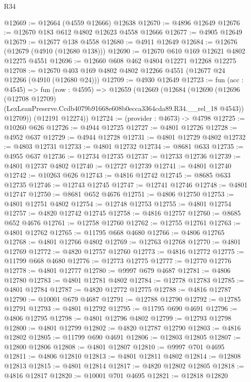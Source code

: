 \begin{lexlean}{R34}
\begin{coremodule}
@12669 := @12664 (@4559 @12666) @12638
@12670 := @4896 @12649
@12676 := @12670 @183 @612 @4802 @12623 @4558 @12666
@12677 := @4905 @12649
@12679 := @12677 @138 @4558
@12680 := @4911 @12649
@12684 := @12676 (@12679 (@4910 (@12680 @138)))
@12690 := @12670 @610 @169 @12621 @4802 @12275 @4551
@12696 := @12660 @608 @462 @4804 @12271 @12268 @12275
@12708 := @12670 @403 @169 @4802 @4802 @12266 @4551 (@12677 @24 @12266 (@4910 (@12680 @24)))
@12709 := @4930 @12649
@12723 := fun (acc : @4545) =>
  fun (row : @4595) =>
  @12659
    (@12669
      (@12684
        (@12690
          (@12696
            (@12708 @12709)
            (LexLeanPreserve.Ccdb4079b91668e608b0ecca3364cda89.R34.__rel_18 @4543))
          @12709))
      (@12191 @12274))
@12724 := (provider : @4673) -> @4798
@12725 := @10260 @626
@12726 := @4944 @12725
@12727 := @4801 @12726
@12728 := @4952 @637
@12729 := @4944 @12728
@12731 := @4801 @12729 @4802
@12732 := @4803 @12731
@12733 := @4801 @12732
@12734 := @8681 @633
@12735 := @4955 @637
@12736 := @12734 @12735
@12737 := @12733 @12736
@12739 := @4801 @12737 @4802
@12740 := @12727 @12739
@12741 := @4801 @12740
@12742 := @10263 @626
@12743 := @4816 @12742
@12745 := @8685 @633 @12735
@12746 := @12743 @12745
@12747 := @12741 @12746
@12748 := @4801 @12747
@12750 := @8681 @652 @4676
@12751 := @4806 @12750
@12753 := @4801 @12751 @4802
@12754 := @12748 @12753
@12755 := @4801 @12754
@12757 := @4820 @12742 @12745
@12758 := @4816 @12757
@12760 := @8685 @652 @4676
@12761 := @12758 @12760
@12762 := @12755 @12761
@12763 := @4801 @12762
@12765 := @11795 @668 @4680
@12766 := @4806 @12765
@12768 := @4801 @12766 @4802
@12769 := @12763 @12768
@12770 := @4801 @12769
@12772 := @4820 @12757 @12760
@12773 := @4816 @12772
@12775 := @11799 @668 @4680
@12776 := @12773 @12775
@12777 := @12770 @12776
@12778 := @4801 @12777
@12780 := @9997 @679 @4687
@12781 := @4806 @12780
@12783 := @4801 @12781 @4802
@12784 := @12778 @12783
@12785 := @4801 @12784
@12787 := @4820 @12772 @12775
@12788 := @4816 @12787
@12790 := @10001 @679 @4687
@12791 := @12788 @12790
@12792 := @12785 @12791
@12793 := @4801 @12792
@12795 := @11795 @690 @4691
@12796 := @4806 @12795
@12798 := @4801 @12796 @4802
@12799 := @12793 @12798
@12800 := @4801 @12799
@12802 := @4820 @12787 @12790
@12803 := @4816 @12802
@12805 := @11799 @690 @4691
@12806 := @12803 @12805
@12807 := @12800 @12806
@12808 := @4801 @12807
@12810 := @9997 @701 @4695
@12811 := @4806 @12810
@12813 := @4801 @12811 @4802
@12814 := @12808 @12813
@12815 := @4801 @12814
@12817 := @4820 @12802 @12805
@12818 := @4816 @12817
@12820 := @10001 @701 @4695
@12821 := @12818 @12820

\end{coremodule}
\end{lexlean}
